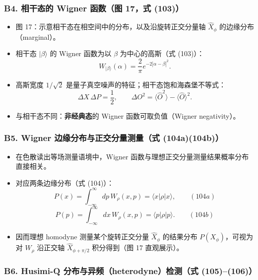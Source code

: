 \documentclass[12pt,a4paper,oneside]{ctexbook}
\providecommand{\tightlist}{%
  \setlength{\itemsep}{0pt}\setlength{\parskip}{0pt}}
\begin{document}
\subsubsection{B4. 相干态的 Wigner 函数（图 17，式
(103)）}\label{b4.-ux76f8ux5e72ux6001ux7684-wigner-ux51fdux6570ux56fe-17ux5f0f-103}

\begin{itemize}
\tightlist
\item
  图 17：示意相干态在相空间中的分布，以及沿旋转正交分量轴
  \(\hat{X}_\phi\) 的边缘分布（marginal）。
\item
  相干态 \(\lvert \beta\rangle\) 的 Wigner 函数为以 \(\beta\)
  为中心的高斯（式 (103)）： \[
  W_{\lvert \beta\rangle}(\alpha)=\frac{2}{\pi}e^{-2|\alpha-\beta|^2}.
  \]
\item
  高斯宽度 \(1/\sqrt{2}\) 是量子真空噪声的特征；相干态饱和海森堡不等式：
  \[
  \Delta X\,\Delta P=\frac{1}{2},\qquad
  \Delta O^2=\langle \hat{O}^2\rangle-\langle \hat{O}\rangle^2 .
  \]
\item
  与相干态不同：\textbf{非经典态}的 Wigner 函数可取负值（Wigner
  negativity）。
\end{itemize}

\subsubsection{B5. Wigner 边缘分布与正交分量测量（式
(104a)(104b)）}\label{b5.-wigner-ux8fb9ux7f18ux5206ux5e03ux4e0eux6b63ux4ea4ux5206ux91cfux6d4bux91cfux5f0f-104a104b}

\begin{itemize}
\tightlist
\item
  在色散读出等场测量语境中，Wigner
  函数与理想正交分量测量结果概率分布直接相关。
\item
  对应两条边缘分布（式 (104)）： \[
  P(x)=\int_{-\infty}^{\infty}dp\,W_\rho(x,p)=\langle x\lvert\rho\rvert x\rangle,
  \qquad (104a)
  \] \[
  P(p)=\int_{-\infty}^{\infty}dx\,W_\rho(x,p)=\langle p\lvert\rho\rvert p\rangle.
  \qquad (104b)
  \]
\item
  因而理想 homodyne 测量某个旋转正交分量 \(\hat{X}_\phi\) 的结果分布
  \(P(X_\phi)\)，可视为对 \(W_\rho\) 沿正交轴 \(\hat{X}_{\phi+\pi/2}\)
  积分得到（图 17 直观展示）。
\end{itemize}

\subsubsection{B6. Husimi-Q 分布与异频（heterodyne）检测（式
(105)--(106)）}\label{b6.-husimi-q-ux5206ux5e03ux4e0eux5f02ux9891heterodyneux68c0ux6d4bux5f0f-105106}
\end{document}

